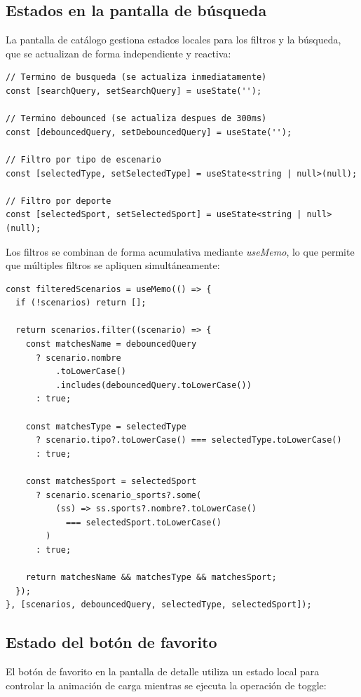 \subsection{Estados en la pantalla de b\'usqueda}

La pantalla de cat\'alogo gestiona estados locales para los filtros y la
b\'usqueda, que se actualizan de forma independiente y reactiva:

\begin{lstlisting}
// Termino de busqueda (se actualiza inmediatamente)
const [searchQuery, setSearchQuery] = useState('');

// Termino debounced (se actualiza despues de 300ms)
const [debouncedQuery, setDebouncedQuery] = useState('');

// Filtro por tipo de escenario
const [selectedType, setSelectedType] = useState<string | null>(null);

// Filtro por deporte
const [selectedSport, setSelectedSport] = useState<string | null>(null);
\end{lstlisting}

Los filtros se combinan de forma acumulativa mediante \textit{useMemo},
lo que permite que m\'ultiples filtros se apliquen simult\'aneamente:

\begin{lstlisting}
const filteredScenarios = useMemo(() => {
  if (!scenarios) return [];

  return scenarios.filter((scenario) => {
    const matchesName = debouncedQuery
      ? scenario.nombre
          .toLowerCase()
          .includes(debouncedQuery.toLowerCase())
      : true;

    const matchesType = selectedType
      ? scenario.tipo?.toLowerCase() === selectedType.toLowerCase()
      : true;

    const matchesSport = selectedSport
      ? scenario.scenario_sports?.some(
          (ss) => ss.sports?.nombre?.toLowerCase()
            === selectedSport.toLowerCase()
        )
      : true;

    return matchesName && matchesType && matchesSport;
  });
}, [scenarios, debouncedQuery, selectedType, selectedSport]);
\end{lstlisting}

\subsection{Estado del bot\'on de favorito}

El bot\'on de favorito en la pantalla de detalle utiliza un estado local
para controlar la animaci\'on de carga mientras se ejecuta la operaci\'on
de toggle:

